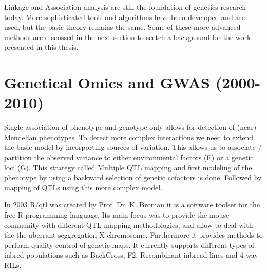Linkage and Association analysis are still the foundation of genetics research today. More 
sophisticated tools and algorithms have been developed and are used, but the basic theory 
remains the same. Some of these more advanced methods are discussed in the next section to 
scetch a background for the work presented in this thesis.

\section{Genetical Omics and GWAS (2000-2010)}

Single association of phenotype and genotype only allows for detection of (near) Mendelian 
phenotypes. To detect more complex interactions we need to extend the basic model by incorporting 
sources of variation. This allows us to associate / partition the observed variance to either 
environmental factors (E) or a genetic loci (G). This strategy called Multiple QTL mapping and 
first modeling of the phenotype by using a backward selection of genetic cofactors is done. 
Followed by mapping of QTLs using this more complex model. \cite{Jansen:1993}

In 2003 R/qtl was created by Prof. Dr. K. Broman it is a software toolset for the free R 
programming language. Its main focus was to provide the mouse community with different QTL 
mapping methodologies, and allow to deal with the the aberrant seggregation X chromosome. 
Furthermore it provides methods to perform quality control of genetic maps. It currently 
supports different types of inbred populations such as BackCross, F2, Recombinant inbread 
lines and 4-way RILs. \cite{Broman:2003}

